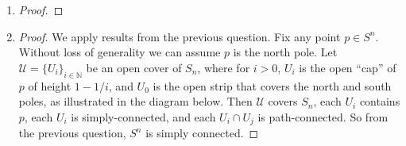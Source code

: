 \documentclass{article}
\begin{document}
\begin{enumerate}
    \item
    \begin{proof}
    \end{proof}

    \item
    \begin{proof}
      We apply results from the previous question. Fix any point $p\in
      S^n$. Without loss of generality we can assume $p$ is the north pole.
      Let $\mathcal{U}=\{U_i\}_{i\in\mathbb{N}}$ be an open cover of $S_n$,
      where for $i>0$, $U_i$ is the open ``cap'' of $p$ of height $1-1/i$,
      and $U_0$ is the open strip that covers the north and south poles, as
      illustrated in the diagram below. Then $\mathcal{U}$ covers $S_n$,
      each $U_i$ contains $p$, each $U_i$ is simply-connected, and each
      $U_i\cap U_j$ is path-connected. So from the previous question, $S^n$
      is simply connected.
    \end{proof}
\end{enumerate}
\end{document}
